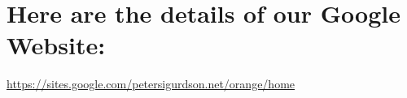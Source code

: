 \section{Here are the details of our Google Website:}

\url{https://sites.google.com/petersigurdson.net/orange/home}